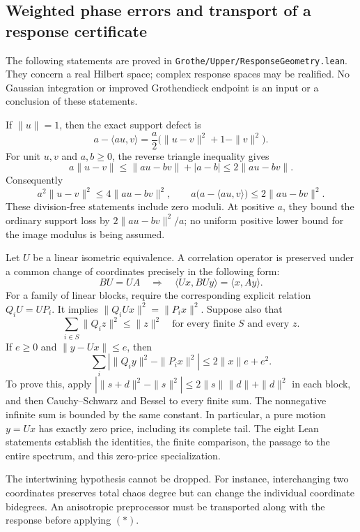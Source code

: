 \subsection{Weighted phase errors and transport of a response certificate}

The following statements are proved in
\texttt{Grothe/Upper/ResponseGeometry.lean}. They concern a real Hilbert space;
complex response spaces may be realified. No Gaussian integration or improved
Grothendieck endpoint is an input or a conclusion of these statements.

If $\|u\|=1$, then the exact support defect is
\[
 a-\langle au,v\rangle
 =\frac a2\bigl(\|u-v\|^2+1-\|v\|^2\bigr).
\]
For unit $u,v$ and $a,b\ge0$, the reverse triangle inequality gives
\[
 a\|u-v\|\le\|au-bv\|+|a-b|\le2\|au-bv\|.
\]
Consequently
\[
 a^2\|u-v\|^2\le4\|au-bv\|^2,
 \qquad
 a\bigl(a-\langle au,v\rangle\bigr)\le2\|au-bv\|^2.
\]
These division-free statements include zero moduli. At positive $a$, they
bound the ordinary support loss by $2\|au-bv\|^2/a$; no uniform positive
lower bound for the image modulus is being assumed.

Let $U$ be a linear isometric equivalence. A correlation operator is preserved
under a common change of coordinates precisely in the following form:
\[
 BU=UA\quad\Longrightarrow\quad
 \langle Ux,BUy\rangle=\langle x,Ay\rangle.
\]
For a family of linear blocks, require the corresponding explicit relation
$Q_iU=UP_i$. It implies $\|Q_iUx\|^2=\|P_ix\|^2$. Suppose also that
\[
 \sum_{i\in S}\|Q_i z\|^2\le\|z\|^2
 \quad\text{for every finite }S\text{ and every }z.
\]
If $e\ge0$ and $\|y-Ux\|\le e$, then
\[
 \sum_i\left|\|Q_i y\|^2-\|P_i x\|^2\right|
 \le2\|x\|e+e^2.                                    \tag{*}
\]
To prove this, apply
$|\|s+d\|^2-\|s\|^2|\le2\|s\|\|d\|+\|d\|^2$
in each block, and then Cauchy--Schwarz and Bessel to every finite sum.
The nonnegative infinite sum is bounded by the same constant. In particular,
a pure motion $y=Ux$ has exactly zero price, including its complete tail.
The eight Lean statements establish the identities, the finite comparison,
the passage to the entire spectrum, and this zero-price specialization.

The intertwining hypothesis cannot be dropped. For instance, interchanging
two coordinates preserves total chaos degree but can change the individual
coordinate bidegrees. An anisotropic preprocessor must be transported along
with the response before applying $(*)$.

